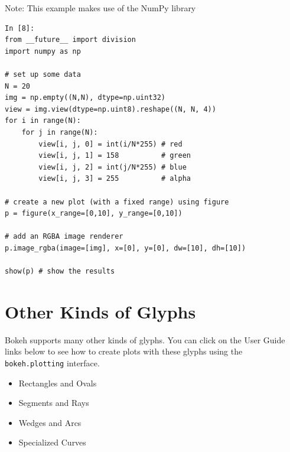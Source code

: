 \documentclass[a4paper,12pt]{article}
\begin{document}
Note: This example makes use of the NumPy library
\begin{framed}
	\begin{verbatim}
In [8]:
from __future__ import division
import numpy as np

# set up some data
N = 20
img = np.empty((N,N), dtype=np.uint32)
view = img.view(dtype=np.uint8).reshape((N, N, 4))
for i in range(N):
    for j in range(N):
        view[i, j, 0] = int(i/N*255) # red
        view[i, j, 1] = 158          # green
        view[i, j, 2] = int(j/N*255) # blue
        view[i, j, 3] = 255          # alpha
        
# create a new plot (with a fixed range) using figure
p = figure(x_range=[0,10], y_range=[0,10])

# add an RGBA image renderer
p.image_rgba(image=[img], x=[0], y=[0], dw=[10], dh=[10])

show(p) # show the results
\end{verbatim}
\end{framed}
\newpage
\section{Other Kinds of Glyphs}
Bokeh supports many other kinds of glyphs. You can click on the User Guide links below to see how to create plots with these glyphs using the \texttt{bokeh.plotting} interface.

\begin{itemize}
\item Rectangles and Ovals
\item Segments and Rays
\item Wedges and Arcs
\item Specialized Curves
\end{itemize}

\end{document}
